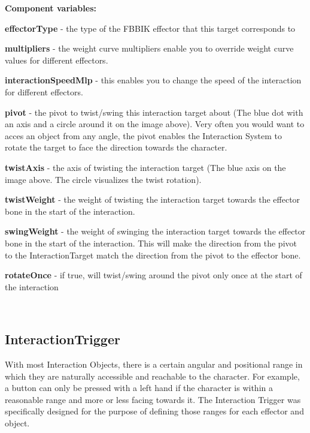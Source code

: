 {\bfseries Component variables\+:}
\begin{DoxyItemize}
\item {\bfseries effector\+Type} -\/ the type of the F\+B\+B\+IK effector that this target corresponds to
\item {\bfseries multipliers} -\/ the weight curve multipliers enable you to override weight curve values for different effectors.
\item {\bfseries interaction\+Speed\+Mlp} -\/ this enables you to change the speed of the interaction for different effectors.
\item {\bfseries pivot} -\/ the pivot to twist/swing this interaction target about (The blue dot with an axis and a circle around it on the image above). Very often you would want to acces an object from any angle, the pivot enables the Interaction System to rotate the target to face the direction towards the character.
\item {\bfseries twist\+Axis} -\/ the axis of twisting the interaction target (The blue axis on the image above. The circle visualizes the twist rotation).
\item {\bfseries twist\+Weight} -\/ the weight of twisting the interaction target towards the effector bone in the start of the interaction.
\item {\bfseries swing\+Weight} -\/ the weight of swinging the interaction target towards the effector bone in the start of the interaction. This will make the direction from the pivot to the Interaction\+Target match the direction from the pivot to the effector bone.
\item {\bfseries rotate\+Once} -\/ if true, will twist/swing around the pivot only once at the start of the interaction
\end{DoxyItemize}



~\newline
 \hypertarget{page10_interactionTrigger}{}\subsection{Interaction\+Trigger}\label{page10_interactionTrigger}
With most Interaction Objects, there is a certain angular and positional range in which they are naturally accessible and reachable to the character. For example, a button can only be pressed with a left hand if the character is within a reasonable range and more or less facing towards it. The Interaction Trigger was specifically designed for the purpose of defining those ranges for each effector and object.



